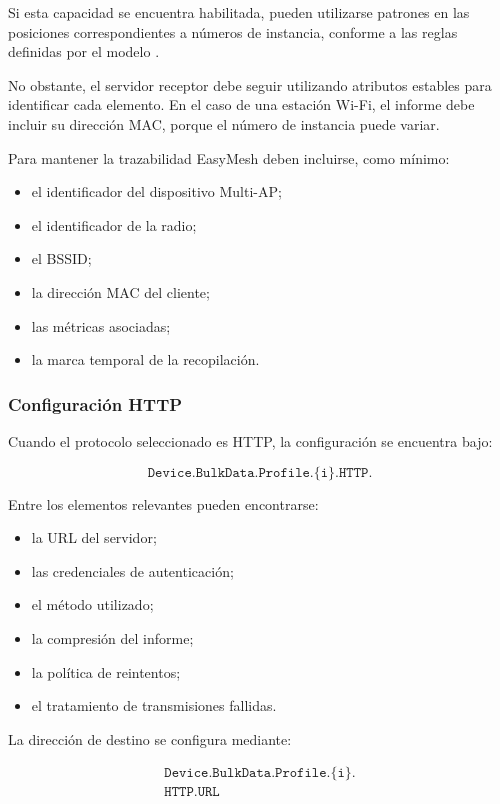 Si esta capacidad se encuentra habilitada, pueden utilizarse patrones en
las posiciones correspondientes a números de instancia, conforme a las
reglas definidas por el modelo \cite{bbf_tr181}.

No obstante, el servidor receptor debe seguir utilizando atributos
estables para identificar cada elemento. En el caso de una estación
Wi-Fi, el informe debe incluir su dirección MAC, porque el número de
instancia puede variar.

Para mantener la trazabilidad EasyMesh deben incluirse, como mínimo:

\begin{itemize}
    \item el identificador del dispositivo Multi-AP;
    \item el identificador de la radio;
    \item el BSSID;
    \item la dirección MAC del cliente;
    \item las métricas asociadas;
    \item la marca temporal de la recopilación.
\end{itemize}


\subsubsection*{Configuración HTTP}

Cuando el protocolo seleccionado es HTTP, la configuración se encuentra
bajo:

\[
    \texttt{Device.BulkData.Profile.\{i\}.HTTP.}
\]

Entre los elementos relevantes pueden encontrarse:

\begin{itemize}
    \item la URL del servidor;
    \item las credenciales de autenticación;
    \item el método utilizado;
    \item la compresión del informe;
    \item la política de reintentos;
    \item el tratamiento de transmisiones fallidas.
\end{itemize}

La dirección de destino se configura mediante:

\[
\begin{split}
    \texttt{Device.BulkData.Profile.\{i\}.}\\
    \texttt{HTTP.URL}
\end{split}
\]

